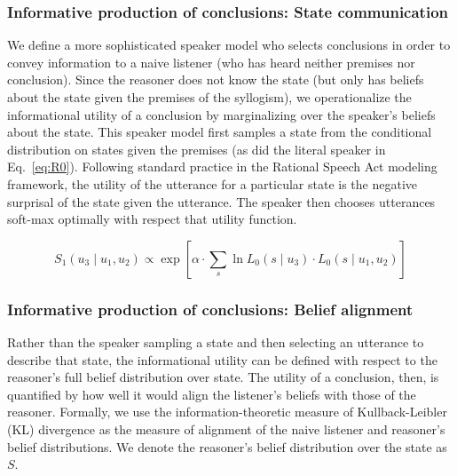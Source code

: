 \documentclass[floatsintext, doc]{apa6}
\newcommand{\mht}[1]{{\textcolor{Blue}{[mht: #1]}}}
\begin{document}
\subsubsection{Informative production of conclusions: State communication}

We define a more sophisticated speaker model who selects conclusions in order to convey information to a naive listener (who has heard neither premises nor conclusion). 
Since the reasoner does not know the state (but only has beliefs about the state given the premises of the syllogism), we operationalize the informational utility of a conclusion by marginalizing over the speaker's beliefs about the state.
This speaker model first samples a state from the conditional distribution on states given the premises (as did the literal speaker in Eq.~\ref{eq:R0}).
Following standard practice in the Rational Speech Act modeling framework, the utility of the utterance for a particular state is the negative surprisal of the state given the utterance.
The speaker then chooses utterances soft-max optimally with respect that utility function.

\begin{equation}
S_1(u_3 \mid u_1, u_2) \propto \exp{ [ \alpha \cdot  \sum_s  \ln L_0(s \mid u_3) \cdot L_0(s \mid u_1, u_2) ] } \label{eq:R1a}
\end{equation}


\subsubsection{Informative production of conclusions: Belief alignment}

Rather than the speaker sampling a state and then selecting an utterance to describe that state, the informational utility can be defined with respect to the reasoner's full belief distribution over state. 
The utility of a conclusion, then, is quantified by how well it would align the listener's beliefs with those of the reasoner. 
Formally, we use the information-theoretic measure of Kullback-Leibler (KL) divergence as the measure of alignment of the naive listener and reasoner's belief distributions. 
We denote the reasoner's belief distribution over the state as $S$.
\end{document}
